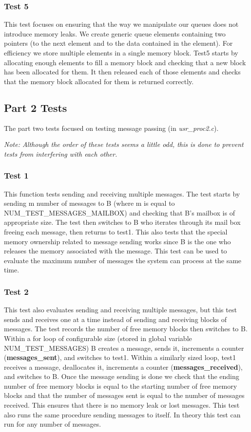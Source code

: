 \documentclass[11pt, oneside]{article}
\begin{document}
\subsubsection{Test 5}
This test focuses on ensuring that the way we manipulate our queues does not introduce memory leaks. We create generic queue elements containing two pointers (to the next element and to the data contained in the element). For efficiency we store multiple elements in a single memory block. Test5 starts by allocating enough elements to fill a memory block and checking that a new block has been allocated for them. It then released each of those elements and checks that the memory block allocated for them is returned correctly.

\subsection{Part 2 Tests}
The part two tests focused on testing message passing (in \textit{usr\_proc2.c}).

\textit{Note: Although the order of these tests seems a little odd, this is done to prevent tests from interfering with each other.}
\subsubsection{Test 1}
This function tests sending and receiving multiple messages. The test starts by sending m number of messages to B (where m is equal to NUM\_TEST\_MESSAGES\_MAILBOX) and checking that B's mailbox is of appropriate size. The test then switches to B who iterates through its mail box freeing each message, then returns to test1. This also tests that the special memory ownership related to message sending works since B is the one who releases the memory associated with the message.  This test can be used to evaluate the maximum number of messages the system can process at the same time.
\subsubsection{Test 2}
This test also evaluates sending and receiving multiple messages, but this test sends and receives one at a time instead of sending and receiving blocks of messages. The test records the number of free memory blocks then switches to B. Within a for loop of configurable size (stored in global variable NUM\_TEST\_MESSAGES) B creates a message, sends it, increments a counter (\textbf{messages\_sent}), and switches to test1. Within a similarly sized loop, test1 receives a message, deallocates it, increments a counter (\textbf{messages\_received}), and switches to B. Once the message sending is done we check that the ending number of free memory blocks is equal to the starting number of free memory blocks and that the number of messages sent is equal to the number of messages received. This ensures that there is no memory leak or lost messages. This test also runs the same procedure sending messages to itself. In theory this test can run for any number of messages.
\end{document}
